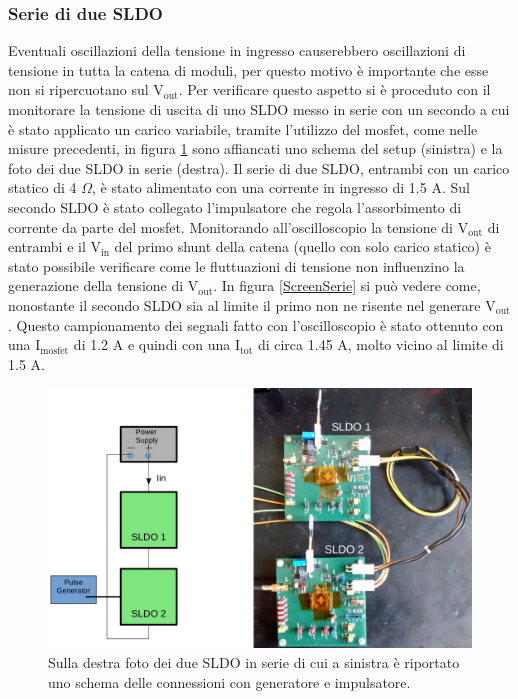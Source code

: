 \subsubsection{Serie di due SLDO}
Eventuali oscillazioni della tensione in ingresso causerebbero oscillazioni di tensione in tutta la catena di moduli, per questo motivo è importante che esse non si ripercuotano sul $\mathrm{V_{out}}$. 
Per verificare questo aspetto si è proceduto con il monitorare la tensione di uscita di uno SLDO messo in serie con un secondo a cui è stato applicato un carico variabile, tramite l'utilizzo del mosfet, come nelle misure precedenti, in figura \ref{SLDOserie} sono affiancati uno schema del setup (sinistra) e la foto dei due SLDO in serie (destra). 
Il serie di due SLDO, entrambi con un carico statico di 4 $\Omega$, è stato alimentato con una corrente in ingresso di 1.5 A. Sul secondo SLDO è stato collegato l'impulsatore che regola l'assorbimento di corrente  da parte del mosfet. 
Monitorando all'oscilloscopio la tensione di $\mathrm{V_{out}}$ di entrambi e il $\mathrm{V_{in}}$ del primo shunt della catena (quello con solo carico statico) è stato possibile verificare come le fluttuazioni di tensione non influenzino la generazione della tensione di $\mathrm{V_{out}}$. In figura \ref{ScreenSerie} si può vedere come, nonostante il secondo SLDO sia al limite il primo non ne risente nel generare $\mathrm{V_{out}}$. 
Questo campionamento dei segnali fatto con l'oscilloscopio è stato ottenuto con una $\mathrm{I_{mosfet}}$ di 1.2 A e quindi con una $\mathrm{I_{tot}}$ di circa 1.45 A, molto vicino al limite di 1.5 A. 
\begin{figure}[h!]
\centering
\includegraphics[scale=.30]{Immagini/SLDOserie}
\caption{Sulla destra foto dei due SLDO in serie di cui a sinistra è riportato uno schema delle connessioni con generatore e impulsatore.}
\label{SLDOserie}
\end{figure}
